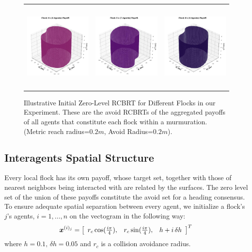 \begin{figure}[tb!]
\begin{tabular}{ccc}
		\includegraphics[height=12em,width=10em]{figures/flock_4.jpg}
		&
		\includegraphics[height=12em,width=10em]{figures/flock_5.jpg} 
		&
		\includegraphics[height=12em,width=10em]{figures/flock_6.jpg}
	\end{tabular}
	\caption{\footnotesize Illustrative Initial Zero-Level RCBRT for Different Flocks in our Experiment. These are the avoid RCBRTs of the aggregated payoffs of all  agents that constitute each  flock within a murmuration.  (Metric reach radius=$0.2m$, Avoid Radius=$0.2m$).} 
	\label{fig:flocks_multi}
\end{figure}

\subsection{Interagents Spatial Structure}

Every local flock has its own payoff, whose target set, together with those of nearest neighbors being interacted with are related by the surfaces. The zero level set of the union of these payoffs constitute the avoid set for a heading consensus. To ensure adequate spatial separation between every agent, we initialize a flock's $j$'s agents, $i=1,\ldots, n$ on the vectogram in the following way:
%
\begin{align}
	\state^{(i)_j} = \left[\begin{array}{ccc}
		r_c \cos (\frac{i\pi}{4}), & 	r_c \sin (\frac{i\pi}{4}), & h+i\,\delta h
	\end{array}\right]^T \, %
\end{align}
%
where $h=0.1, \, \delta h = 0.05$ and $r_c$ is a collision avoidance radius.
